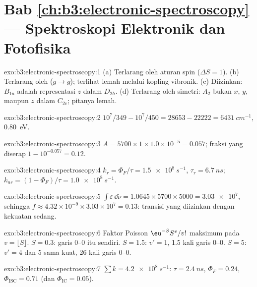 \section*{Bab \ref{ch:b3:electronic-spectroscopy} --- Spektroskopi Elektronik dan Fotofisika}

\begin{solution}{exo:b3:electronic-spectroscopy:1}
(a) Terlarang oleh aturan spin ($\Delta S = 1$). (b) Terlarang oleh  ($g \to g$); terlihat lemah melalui kopling vibronik. (c) Diizinkan:
$B_{1u}$ adalah representasi $z$ dalam $D_{2h}$. (d) Terlarang oleh simetri:
$A_2$ bukan $x$, $y$, maupun $z$ dalam $C_{2v}$; pitanya lemah.
\end{solution}

\begin{solution}{exo:b3:electronic-spectroscopy:2}
$10^7/349 - 10^7/450 = 28653 - 22222 = \qty{6431}{cm^{-1}}$, \qty{0.80}{eV}.
\end{solution}

\begin{solution}{exo:b3:electronic-spectroscopy:3}
$A = 5700 \times 1 \times 1.0\times10^{-5} = 0.057$; fraksi yang diserap
$1 - 10^{-0.057} =
0.12$.
\end{solution}

\begin{solution}{exo:b3:electronic-spectroscopy:4}
$k_r = \Phi_F/\tau = \qty{1.5e8}{s^{-1}}$, $\tau_r = \qty{6.7}{ns}$; $k_{nr} = (1 - \Phi_F)/\tau
= \qty{1.0e8}{s^{-1}}$.
\end{solution}

\begin{solution}{exo:b3:electronic-spectroscopy:5}
$\int\varepsilon\,\dd\tilde\nu = 1.0645 \times 5700 \times 5000 = \num{3.03e7}$, sehingga
$f \approx
4.32\times10^{-9} \times 3.03\times10^7 = 0.13$: transisi yang
diizinkan dengan kekuatan sedang.
\end{solution}

\begin{solution}{exo:b3:electronic-spectroscopy:6}
Faktor Poisson $\eu^{-S}S^v/v!$ maksimum pada $v = \lfloor S\rfloor$. $S = 0.3$:
garis 0--0 itu sendiri. $S = 1.5$: $v' = 1$, 1.5 kali garis 0--0. $S = 5$:
$v' = 4$ dan 5 sama kuat, 26 kali garis 0--0.
\end{solution}

\begin{solution}{exo:b3:electronic-spectroscopy:7}
$\sum k = \qty{4.2e8}{s^{-1}}$: $\tau = \qty{2.4}{ns}$, $\Phi_F = 0.24$, $\Phi_{\mathrm{ISC}} = 0.71$
(dan $\Phi_{\mathrm{IC}} = 0.05$).
\end{solution}

